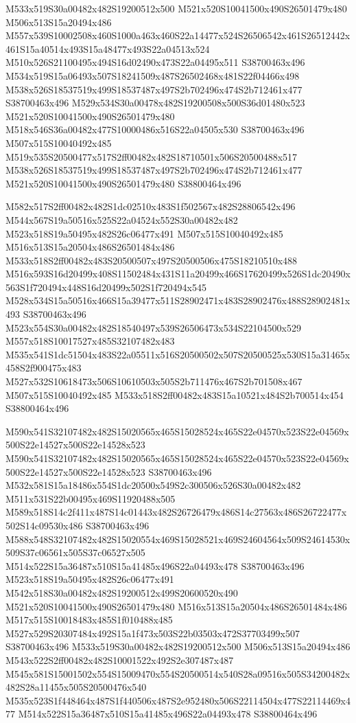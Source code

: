 \documentclass{article}
\begin{document}
\begin{multicols}{2}
M533x519S30a00482x482S19200512x500 M521x520S10041500x490S26501479x480 M506x513S15a20494x486 M557x539S10002508x460S1000a463x460S22a14477x524S26506542x461S26512442x461S15a40514x493S15a48477x493S22a04513x524 M510x526S21100495x494S16d02490x473S22a04495x511 S38700463x496 M534x519S15a06493x507S18241509x487S26502468x481S22f04466x498 M538x526S18537519x499S18537487x497S2b702496x474S2b712461x477 S38700463x496 M529x534S30a00478x482S19200508x500S36d01480x523 M521x520S10041500x490S26501479x480 M518x546S36a00482x477S10000486x516S22a04505x530 S38700463x496 M507x515S10040492x485 M519x535S20500477x517S2ff00482x482S18710501x506S20500488x517 M538x526S18537519x499S18537487x497S2b702496x474S2b712461x477 M521x520S10041500x490S26501479x480 S38800464x496

M582x517S2ff00482x482S1dc02510x483S1f502567x482S28806542x496 M544x567S19a50516x525S22a04524x552S30a00482x482 M523x518S19a50495x482S26c06477x491 M507x515S10040492x485 M516x513S15a20504x486S26501484x486 M533x518S2ff00482x483S20500507x497S20500506x475S18210510x488 M516x593S16d20499x408S11502484x431S11a20499x466S17620499x526S1dc20490x563S1f720494x448S16d20499x502S1f720494x545 M528x534S15a50516x466S15a39477x511S28902471x483S28902476x488S28902481x493 S38700463x496 M523x554S30a00482x482S18540497x539S26506473x534S22104500x529 M557x518S10017527x485S32107482x483 M535x541S1dc51504x483S22a05511x516S20500502x507S20500525x530S15a31465x458S2f900475x483 M527x532S10618473x506S10610503x505S2b711476x467S2b701508x467 M507x515S10040492x485 M533x518S2ff00482x483S15a10521x484S2b700514x454 S38800464x496

M590x541S32107482x482S15020565x465S15028524x465S22e04570x523S22e04569x500S22e14527x500S22e14528x523 M590x541S32107482x482S15020565x465S15028524x465S22e04570x523S22e04569x500S22e14527x500S22e14528x523 S38700463x496 M532x581S15a18486x554S1dc20500x549S2c300506x526S30a00482x482 M511x531S22b00495x469S11920488x505 M589x518S14c2f411x487S14c01443x482S26726479x486S14c27563x486S26722477x502S14c09530x486 S38700463x496 M588x548S32107482x482S15020554x469S15028521x469S24604564x509S24614530x509S37c06561x505S37c06527x505 M514x522S15a36487x510S15a41485x496S22a04493x478 S38700463x496 M523x518S19a50495x482S26c06477x491 M542x518S30a00482x482S19200512x499S20600520x490 M521x520S10041500x490S26501479x480 M516x513S15a20504x486S26501484x486 M517x515S10018483x485S1f010488x485 M527x529S20307484x492S15a1f473x503S22b03503x472S37703499x507 S38700463x496 M533x519S30a00482x482S19200512x500 M506x513S15a20494x486 M543x522S2ff00482x482S10001522x492S2e307487x487 M545x581S15001502x554S15009470x554S20500514x540S28a09516x505S34200482x482S28a11455x505S20500476x540 M535x523S1f448464x487S1f440506x487S2e952480x506S22114504x477S22114469x477 M514x522S15a36487x510S15a41485x496S22a04493x478 S38800464x496


\end{multicols}
\end{document}
